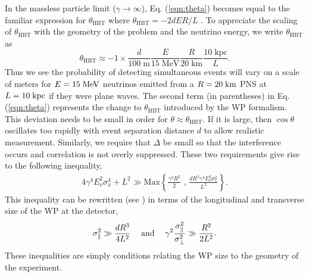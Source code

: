 \documentclass[aps,prl,reprint,floatfix
]{revtex4-1}
\begin{document}
In the massless particle limit ($\gamma\rightarrow\infty$), Eq. (\ref{eqn:theta}) becomes equal to the familiar expression for $\theta_\text{HBT}$ where $\theta_\text{HBT}=-2d E R/L$ \cite{2006PhRvL..96l1802G}. 
To appreciate the scaling of $\theta_\text{HBT}$ with the geometry of the problem and the neutrino energy, we write $\theta_\text{HBT}$ as
\begin{equation}
\theta_\text{HBT}\approx -1\times
	\frac{d}{100\;\text{m}}
	\frac{E}{15\;\text{MeV}}
	\frac{R}{20\;\text{km}}
	\frac{10\;\text{kpc}}{L}.
\end{equation}
Thus we see the probability of detecting simultaneous events will vary on a scale of meters for $E=15\;{\rm MeV}$ neutrinos emitted from a $R=20\;{\rm km}$ PNS at $L=10\;{\rm kpc}$ if they were plane waves. 
The second term (in parentheses) in Eq. (\ref{eqn:theta}) represents the change to $\theta_\text{HBT}$ introduced by the WP formalism. This deviation needs to be small in order for $\theta\approx\theta_\text{HBT}$. If it is large, then $\cos\theta$ oscillates too rapidly with event separation distance $d$ to allow realistic measurement. Similarly, we require that $\Delta$ be small so that the interference occurs and correlation is not overly suppressed. These two requirements give rise to the following inequality, 
\begin{align}
	4\gamma^4E_\nu^2\sigma_x^4+L^2\gg\text{Max}\left\{\frac{\gamma^2R^2}{2}\text{ , }\frac{dR^3\gamma^4E_\nu^2\sigma_x^2}{L^2}\right\}.
\end{align}
This inequality can be rewritten (see \cite{SupplementalMaterial}) in terms of the longitudinal and transverse size of the WP at the detector,
\begin{align}
	\sigma_\parallel^2\gg\frac{d R^3}{4L^2}\quad\text{\;and\;}\quad
	\gamma^2\frac{\sigma_\parallel^2}{\sigma_\perp^2}\gg\frac{R^2}{2L^2}.
    \label{Eqn:Inequalities}
\end{align}
These inequalities are simply conditions relating the WP size to the geometry of the experiment. 
\end{document}
